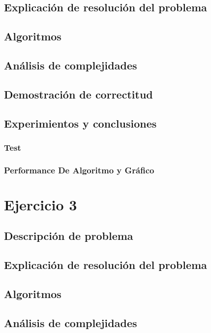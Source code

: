 \documentclass[12pt, a4paper]{article}
\begin{document}
\subsection{Explicaci\'on de resoluci\'on del problema}

\subsection{Algoritmos}

\subsection{An\'alisis de complejidades}

\subsection{Demostraci\'on de correctitud}

\subsection{Experimientos y conclusiones}
\subsubsection[2.5]{Test}

\subsubsection[2.5]{Performance De Algoritmo y Gr\'afico}


\newpage
\section{Ejercicio 3} 
\subsection{Descripci\'on de problema}

\subsection{Explicaci\'on de resoluci\'on del problema}

\subsection{Algoritmos}

\subsection{An\'alisis de complejidades}

\end{document}
